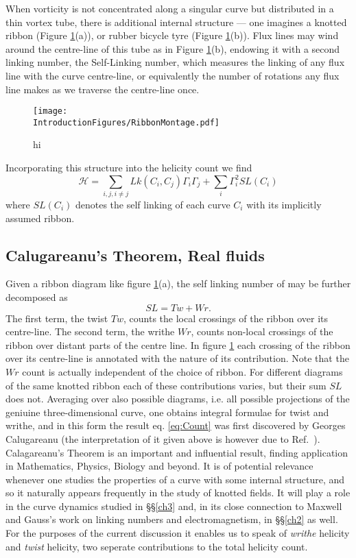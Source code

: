 When vorticity is not concentrated along a singular curve but distributed in a thin vortex tube, there is additional internal structure --- one imagines a knotted ribbon (Figure \ref{fig:RibbonMontage}(a)), or rubber bicycle tyre (Figure \ref{fig:RibbonMontage}(b)). Flux lines may wind around the centre-line of this tube as in Figure \ref{fig:RibbonMontage}(b), endowing it with a second linking number, the Self-Linking number, which measures the linking of any flux line with the curve centre-line, or equivalently the number of rotations any flux line makes as we traverse the centre-line once. 
\begin{figure}[htbp]
\centering
\texttt{[image: \\IntroductionFigures/RibbonMontage.pdf]}
\caption{hi }
\label{fig:RibbonMontage}
\end{figure}
Incorporating this structure into the helicity count we find \cite{MoffatRicca}
\begin{equation}
    \mathcal{H} = \sum_{i,j, i\neq j} Lk(C_i,C_j) \Gamma_i \Gamma_j + \sum_{i} \Gamma_i^2 SL(C_i) 
    \label{eq:HelicityCount}
\end{equation}
where $SL(C_i)$ denotes the self linking of each curve $C_i$ with its implicitly assumed ribbon. 

\subsection{Calugareanu's Theorem, Real fluids}
Given a ribbon diagram like figure \ref{fig:RibbonMontage}(a), the self linking number of may be further decomposed as
\begin{equation}
    SL = Tw + Wr.
    \label{eq:Count}
\end{equation}
The first term, the twist $Tw$, counts the local crossings of the ribbon over its centre-line. The second term, the writhe $Wr$, counts non-local crossings of the ribbon over distant parts of the centre line. In figure \ref{fig:RibbonMontage} each crossing of the ribbon over its centre-line is annotated with the nature of its contribution. Note that the $Wr$ count is actually independent of the choice of ribbon. For different diagrams of the same knotted ribbon each of these contributions varies, but their sum $SL$ does not. Averaging over also possible diagrams, i.e. all possible projections of the geniuine three-dimensional curve, one obtains integral formulae for twist and writhe, and in this form the result eq. \ref{eq:Count} was first discovered by Georges Calugareanu \cite{Cal} (the interpretation of it given above is however due to Ref.~\cite{Dennis}). Calagareanu's Theorem is an important and influential result, finding application in Mathematics, Physics, Biology and beyond. It is of potential relevance whenever one studies the properties of a curve with some internal structure, and so it naturally appears frequently in the study of knotted fields. It will play a role in the curve dynamics studied in \S\S\ref{ch3} and, in its close connection to Maxwell and Gauss's work on linking numbers and electromagnetism, in \S\S\ref{ch2} as well. For the purposes of the current discussion it enables us to speak of \emph{writhe} helicity and \emph{twist} helicity, two seperate contributions to the total helicity count.    

